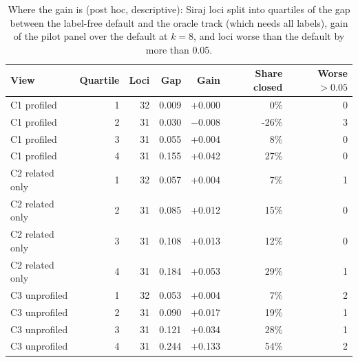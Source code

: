 \begin{table}[H]
\caption{Where the gain is (post hoc, descriptive): Siraj loci split into quartiles of the gap between the label-free default and the oracle track (which needs all labels), gain of the pilot panel over the default at $k=8$, and loci worse than the default by more than 0.05.}\label{tab:s8}
\centering\small
\begin{tabular}{lrrrrrr}
\toprule
View & Quartile & Loci & Gap & Gain & Share closed & Worse $>0.05$ \\
\midrule
C1 profiled & 1 & 32 & 0.009 & +0.000 & 0\% & 0 \\
C1 profiled & 2 & 31 & 0.030 & $-$0.008 & -26\% & 3 \\
C1 profiled & 3 & 31 & 0.055 & +0.004 & 8\% & 0 \\
C1 profiled & 4 & 31 & 0.155 & +0.042 & 27\% & 0 \\
C2 related only & 1 & 32 & 0.057 & +0.004 & 7\% & 1 \\
C2 related only & 2 & 31 & 0.085 & +0.012 & 15\% & 0 \\
C2 related only & 3 & 31 & 0.108 & +0.013 & 12\% & 0 \\
C2 related only & 4 & 31 & 0.184 & +0.053 & 29\% & 1 \\
C3 unprofiled & 1 & 32 & 0.053 & +0.004 & 7\% & 2 \\
C3 unprofiled & 2 & 31 & 0.090 & +0.017 & 19\% & 1 \\
C3 unprofiled & 3 & 31 & 0.121 & +0.034 & 28\% & 1 \\
C3 unprofiled & 4 & 31 & 0.244 & +0.133 & 54\% & 2 \\
\bottomrule
\end{tabular}
\end{table}

